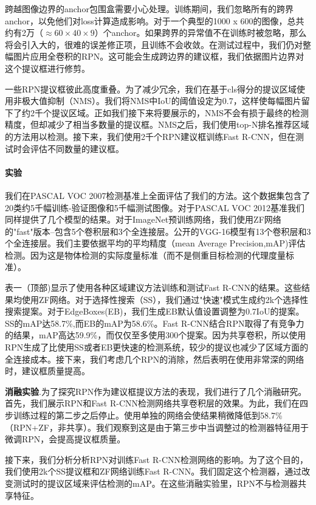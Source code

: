 \documentclass[12pt,a4paper,titlepage]{article}
\begin{document}
跨越图像边界的anchor包围盒需要小心处理。训练期间，我们忽略所有的跨界anchor，以免他们对loss计算造成影响。对于一个典型的1000 x 600的图像，总共约有2万（$ \approx 60 \times 40 \times 9$）个anchor。如果跨界的异常值不在训练时被忽略，那么将会引入大的，很难的误差修正项，且训练不会收敛。在测试过程中，我们仍对整幅图片应用全卷积的RPN。这可能会生成跨边界的建议框，我们依据图片边界对这个提议框进行修剪。\par

一些RPN提议框彼此高度重叠。为了减少冗余，我们在基于cls得分的提议区域使用非极大值抑制（NMS）。我们将NMS中IoU的阈值设定为0.7，这样使每幅图片留下了约2千个提议区域。正如我们接下来将要展示的，NMS不会有损于最终的检测精度，但却减少了相当多数量的提议框。NMS之后，我们使用top-N排名推荐区域的方法用以检测。接下来，我们使用2千个RPN建议框训练Fast R-CNN，但在测试时会评估不同数量的建议框。

\paragraph{实验}
我们在PASCAL VOC 2007检测基准上全面评估了我们的方法。这个数据集包含了20类约5千幅训练-验证图像和5千幅测试图像。对于PASCAL VOC 2012基准我们同样提供了几个模型的结果。对于ImageNet预训练网络，我们使用ZF网络的"fast"版本--包含5个卷积层和3个全连接层。公开的VGG-16模型有13个卷积层和3个全连接层。我们主要依据平均的平均精度（mean Average Precision,mAP)评估检测。因为这是物体检测的实际度量标准（而不是侧重目标检测的代理度量标准）。\par

表一（顶部)显示了使用各种区域建议方法训练和测试Fast R-CNN的结果。这些结果均使用ZF网络。对于选择性搜索（SS），我们通过"快速"模式生成约2k个选择性搜索提案。对于EdgeBoxes(EB)，我们生成EB默认值设置调整为0.7IoU的提案。SS的mAP达58.7\%,而EB的mAP为58.6\%。Fast R-CNN结合RPN取得了有竞争力的结果，mAP高达59.9\%，而仅仅至多使用300个提案。因为共享卷积，所以使用RPN生成了比使用SS或者EB更快速的检测系统，较少的提议也减少了区域方面的全连接成本。接下来，我们考虑几个RPN的消除，然后表明在使用非常深的网络时，建议框质量提高。\par
\textbf{消融实验}.为了探究RPN作为建议框提议方法的表现，我们进行了几个消融研究。首先，我们展示RPN和Fast R-CNN检测网络共享卷积层的效果。为此，我们在四步训练过程的第二步之后停止。使用单独的网络会使结果稍微降低到58.7\%（RPN+ZF，非共享）。我们观察到这是由于第三步中当调整过的检测器特征用于微调RPN，会提高提议框质量。\par

接下来，我们分析分析RPN对训练Fast R-CNN检测网络的影响。为了这个目的，我们使用2k个SS提议框和ZF网络训练Fast R-CNN。我们固定这个检测器，通过改变测试时的提议区域来评估检测的mAP。在这些消融实验里，RPN不与检测器共享特征。\par
\end{document}
